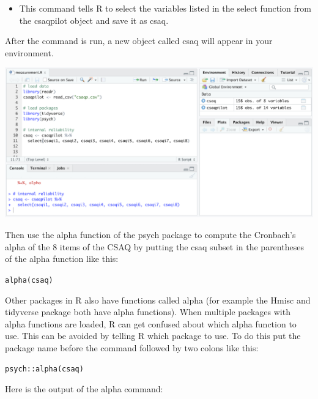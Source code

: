 \documentclass[
]{book}
\providecommand{\tightlist}{%
  \setlength{\itemsep}{0pt}\setlength{\parskip}{0pt}}
\begin{document}
\begin{itemize}
\tightlist
\item
  This command tells R to select the variables listed in the select function from the csaqpilot object and save it as csaq.
\end{itemize}

After the command is run, a new object called csaq will appear in your environment.

\includegraphics{img/4R.2.png}

Then use the alpha function of the psych package to compute the Cronbach's alpha of the 8 items of the CSAQ by putting the csaq subset in the parentheses of the alpha function like this:

\texttt{alpha(csaq)}

Other packages in R also have functions called alpha (for example the Hmisc and tidyverse package both have alpha functions). When multiple packages with alpha functions are loaded, R can get confused about which alpha function to use. This can be avoided by telling R which package to use. To do this put the package name before the command followed by two colons like this:

\texttt{psych::alpha(csaq)}

Here is the output of the alpha command:
\end{document}
